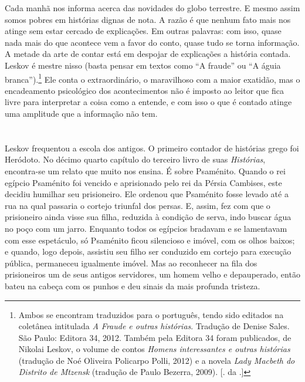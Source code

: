 Cada manhã nos informa acerca das novidades do globo terrestre. E mesmo
assim somos pobres em histórias dignas de nota. A razão é que nenhum
fato mais nos atinge sem estar cercado de explicações. Em outras
palavras: com isso, quase nada mais do que acontece vem a favor do
conto, quase tudo se torna informação. A metade da arte de contar está em
despojar de explicações a história contada\label{supra3}. Leskov é mestre nisso (basta
pensar em textos como ``A fraude'' ou ``A águia branca'').\footnote{Ambos
  se encontram traduzidos para o português, tendo sido editados na
  coletânea intitulada \emph{A Fraude e outras histórias}. Tradução de
  Denise Sales. São Paulo: Editora 34, 2012. Também pela Editora 34
  foram publicados, de Nikolai Leskov, o volume de contos \emph{Homens
  interessantes e outras histórias} (tradução de Noé Oliveira Policarpo
  Polli, 2012) e a novela \emph{Lady Macbeth do Distrito de Mtzensk}
  (tradução de Paulo Bezerra, 2009). [. da .]} Ele
conta o extraordinário, o maravilhoso com a maior exatidão, mas o
encadeamento psicológico dos acontecimentos não é imposto ao leitor
que fica livre para interpretar a coisa como a entende, e com isso o
que é contado atinge uma amplitude que a informação não tem.

\section{}

Leskov frequentou a escola dos antigos. O primeiro contador de histórias
grego foi Heródoto. No décimo quarto capítulo do terceiro livro de suas
\emph{Histórias}, encontra-se um relato que muito nos ensina. É sobre
Psaménito. Quando o rei egípcio Psaménito foi vencido e aprisionado pelo
rei da Pérsia Cambises, este decidiu humilhar seu prisioneiro. Ele
ordenou que Psaménito fosse levado até a rua na qual passaria o cortejo
triunfal dos persas. E, assim, fez com que o prisioneiro ainda visse sua
filha, reduzida à condição de serva, indo buscar água no poço com um
jarro. Enquanto todos os egípcios bradavam e se lamentavam com esse
espetáculo, só Psaménito ficou silencioso e imóvel, com os olhos baixos;
e quando, logo depois, assistiu seu filho ser conduzido em cortejo para
execução pública, permaneceu igualmente imóvel. Mas ao reconhecer na
fila dos prisioneiros um de seus antigos servidores, um homem velho e
depauperado, então bateu na cabeça com os punhos e deu sinais da mais
profunda tristeza.

